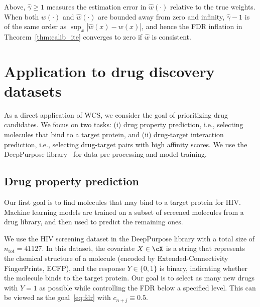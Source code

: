 Above, $\hat\gamma\geq 1$ measures the estimation error in $\hat{w}(\cdot)$
relative to the true weights.
When both $w(\cdot)$ and $\hat{w}(\cdot)$
are bounded away from zero and infinity,
$\hat\gamma-1$ is of the same order as $ \sup_x|\hat{w}(x)-w(x)|$,
and hence the FDR inflation in Theorem~\ref{thm:calib_ite} converges to zero
if $\hat{w}$ is consistent.
\section{Application to drug discovery datasets}
\label{sec:drug}
{As a direct application of WCS, we consider the goal of
prioritizing drug candidates.
We focus on two tasks:
(i) drug property prediction, i.e.,
selecting molecules that bind to a target protein, and
(ii) drug-target interaction prediction, i.e.,
selecting drug-target pairs with high affinity scores.}
We use  the
DeepPurpose library~\cite{huang2020deeppurpose} for data pre-processing and model training.

\subsection{Drug property prediction}
\label{subsec:drug_pred}

Our first goal is to find molecules that may bind to a target protein for HIV.
Machine learning models
are  trained on a subset of screened molecules from
a drug library,
and  then  used to predict the remaining ones.


We use the HIV screening dataset in the DeepPurpose library
with a total size of $n_\textrm{tot}=41127$.
In this dataset, the covariate $X\in \cX$ is
a string that represents the chemical structure of a molecule
(encoded by Extended-Connectivity FingerPrints, ECFP), and
the response $Y\in \{0,1\}$ is binary, indicating whether
the molecule binds to the target protein.
Our goal is to select as many new drugs with $Y=1$ as possible while
controlling the FDR below a specified level.
This can be viewed as the goal~\eqref{eq:fdr} with $c_{n+j}\equiv 0.5$.

